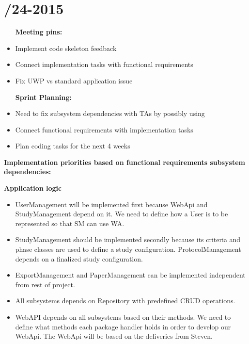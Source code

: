 \section{/24-2015} %
\attend{\at}{\at}{\at}{\at}


\begin{itemize}
	\item [\textbf{Meeting pins:}]
	\item Implement code skeleton feedback
	\item Connect implementation tasks with functional requirements
	\item Fix UWP vs standard application issue 
\end{itemize}

\begin{itemize}
	\item [\textbf{Sprint Planning:}]
	\item Need to fix subsystem dependencies with TAs by possibly using 
	\item Connect functional requirements with implementation tasks
	\item Plan coding tasks for the next 4 weeks 
\end{itemize}

\newpage

\textbf{Implementation priorities based on functional requirements subsystem dependencies:}

\textbf{Application logic}
\begin{itemize}
	\item UserManagement will be implemented first because WebApi and StudyManagement depend on it. We need to define how a User is to be represented so that SM can use WA. 
	\item StudyManagement should be implemented secondly because its criteria and phase classes are used to define a study configuration. ProtocolManagement depends on a finalized study configuration.
	\item ExportManagement and PaperManagement can be implemented independent from rest of project. 
	\item All subsystems depends on Repository with predefined CRUD operations.
	\item WebAPI depends on all subsystems based on their methods. We need to define what methods each package handler holds in order to develop our WebApi. The WebApi will be based on the deliveries from Steven. 
\end{itemize} 

